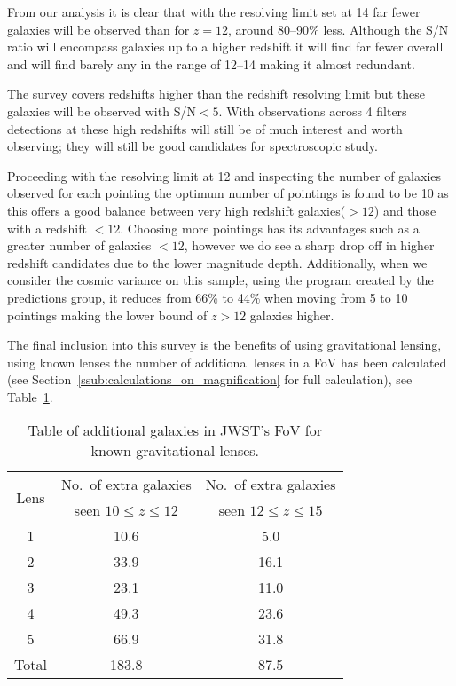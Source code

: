 	From our analysis it is clear that with the resolving limit set at 14 far fewer galaxies will be observed than for $z=12$, around 80--90\% less. Although the S/N ratio will encompass galaxies up to a higher redshift it will find far fewer overall and will find barely any in the range of 12--14 making it almost redundant.

	The survey covers redshifts higher than the redshift resolving limit but these galaxies will be observed with S/N$< 5$. With observations across 4 filters detections at these high redshifts will still be of much interest and worth observing; they will still be good candidates for spectroscopic study.

	Proceeding with the resolving limit at 12 and inspecting the number of galaxies observed for each pointing the optimum number of pointings is found to be 10 as this offers a good balance between very high redshift galaxies($>12$) and those with a redshift $<12$. Choosing more pointings has its advantages such as a greater number of galaxies $<12$, however we do see a sharp drop off in higher redshift candidates due to the lower magnitude depth. Additionally, when we consider the cosmic variance on this sample, using the program created by the predictions group, it reduces from 66\% to 44\% when moving from 5 to 10 pointings making the lower bound of $z>12$ galaxies higher.

	The final inclusion into this survey is the benefits of using gravitational lensing, using known lenses the number of additional lenses in a FoV has been calculated (see Section~\ref{ssub:calculations_on_magnification} for full calculation), see Table~\ref{tab:FoV_for_known_gravitational_lenses}.
	\begin{table}[!htbp]
		\begin{center}
			\begin{tabular}{c|c|c}
				\multirow{2}{*}{Lens} & No.\ of extra galaxies & No.\ of extra galaxies  \\
				 & seen $10\le z \le12$ & seen $12\le z \le15$ \\
				 \hline\hline
				1 	& 10.6 		& 5.0 \\
				2 	& 33.9 		& 16.1 \\
				3 	& 23.1 		& 11.0 \\
				4 	& 49.3 		& 23.6 \\
				5 	& 66.9 		& 31.8 \\
				\hline
				Total & 183.8 	& 87.5
			\end{tabular}
		\end{center}
		\caption{Table of additional galaxies in JWST’s FoV for known gravitational lenses.\label{tab:FoV_for_known_gravitational_lenses}}
	\end{table}

